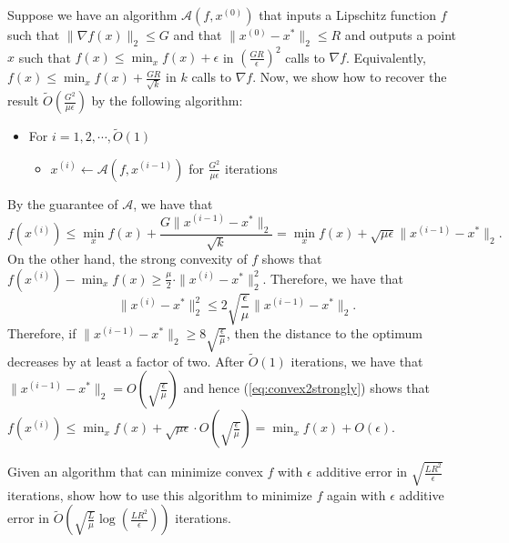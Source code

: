 Suppose we have an algorithm $\mathcal{A}(f,x^{(0)})$ that inputs
a Lipschitz function $f$ such that $\|\nabla f(x)\|_{2}\leq G$ and
that $\|x^{(0)}-x^{*}\|_{2}\leq R$ and outputs a point $x$ such
that $f(x)\leq\min_{x}f(x)+\epsilon$ in $(\frac{GR}{\epsilon})^{2}$
calls to $\nabla f$. Equivalently, $f(x)\leq\min_{x}f(x)+\frac{GR}{\sqrt{k}}$
in $k$ calls to $\nabla f$. Now, we show how to recover the result
$\widetilde{O}(\frac{G^{2}}{\mu\epsilon})$ by the following algorithm:
\begin{itemize}
\item For $i=1,2,\cdots,\widetilde{O}(1)$
\begin{itemize}
\item $x^{(i)}\leftarrow\mathcal{A}(f,x^{(i-1)})$ for $\frac{G^{2}}{\mu\epsilon}$
iterations
\end{itemize}
\end{itemize}
By the guarantee of $\mathcal{A}$, we have that 
\begin{equation}
f(x^{(i)})\leq\min_{x}f(x)+\frac{G\|x^{(i-1)}-x^{*}\|_{2}}{\sqrt{k}}=\min_{x}f(x)+\sqrt{\mu\epsilon}\|x^{(i-1)}-x^{*}\|_{2}.\label{eq:convex2strongly}
\end{equation}
On the other hand, the strong convexity of $f$ shows that $f(x^{(i)})-\min_{x}f(x)\geq\frac{\mu}{2}\cdot\|x^{(i)}-x^{*}\|^{2}_{2}$.
Therefore, we have that
\[
\|x^{(i)}-x^{*}\|^{2}_{2}\leq2\sqrt{\frac{\epsilon}{\mu}}\|x^{(i-1)}-x^{*}\|_{2}.
\]
Therefore, if $\|x^{(i-1)}-x^{*}\|_{2}\geq8\sqrt{\frac{\epsilon}{\mu}}$,
then the distance to the optimum decreases by at least a factor of
two. After $\widetilde{O}(1)$ iterations, we have that $\|x^{(i-1)}-x^{*}\|_{2}=O\left(\sqrt{\frac{\epsilon}{\mu}}\right)$
and hence (\ref{eq:convex2strongly}) shows that $f(x^{(i)})\leq\min_{x}f(x)+\sqrt{\mu\epsilon}\cdot O\left(\sqrt{\frac{\epsilon}{\mu}}\right)=\min_{x}f(x)+O(\epsilon)$.
\begin{xca}
Given an algorithm that can minimize convex $f$ with $\epsilon$
additive error in $\sqrt{\frac{LR^{2}}{\epsilon}}$ iterations, show
how to use this algorithm to minimize $f$ again with $\epsilon$
additive error in $\widetilde{O}\left(\sqrt{\frac{L}{\mu}}\log\left(\frac{LR^{2}}{\epsilon}\right)\right)$
iterations.
\end{xca}


\subsection*{}%

